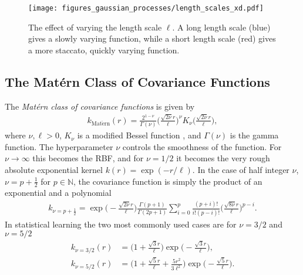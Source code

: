 \documentclass[twoside,english]{uiofysmaster}
\begin{document}
{{\begin{figure}
\centering
\texttt{[image: figures\_gaussian\_processes/length\_scales\_xd.pdf]}
\caption[An illustration of length scales]{The effect of varying the length scale $\ell$. A long length scale (blue) gives a slowly varying function, while a short length scale (red) gives a more staccato, quickly varying function.}
\label{Fig:: gaussian process : ell variation example}
\end{figure}


\subsection{The Mat\'{e}rn Class of Covariance Functions}\label{Sec:: gaussian process : Matern Class of Covariance Functions}

The \textit{Mat\'{e}rn class of covariance functions} is given by
\begin{align}\label{Eq:: gaussian process : Matern class of covariance functions}
k_{\mathrm{Mat\acute{e}rn}} (r) = \frac{2^{1- \nu}}{\Gamma (\nu)} \Big( \frac{\sqrt{2 \nu} r	}{\ell} \Big)^{\nu} K_{\nu} \Big( \frac{\sqrt{2 \nu}r}{\ell} \Big),
\end{align}
where $\nu, \ell > 0$, $K_{\nu}$ is a modified Bessel function \cite{abramowitz1964handbook}, and $\Gamma(\nu)$ is the gamma function. The hyperparameter $\nu$ controls the smoothness of the function. For $\nu \rightarrow \infty$ this becomes the RBF, and for $\nu = 1/2$ it becomes the very rough absolute exponential kernel $k(r)= \exp (-r/\ell)$. In the case of half integer $\nu$, $\nu = p + \frac{1}{2}$ for $p \in \mathbb{N}$, the covariance function is simply the product of an exponential and a polynomial
\begin{align}
k_{\nu=p+\frac{1}{2}} = \exp \Big(- \frac{\sqrt{2 \nu} r	}{\ell} \Big) \frac{\Gamma(p+1)}{\Gamma(2p + 1)} \sum^p_{i=0} \frac{(p+i)!}{i!(p-i)!} \Big( \frac{\sqrt{8 \nu} r	}{\ell} \Big)^{p-i}.
\end{align}
In statistical learning the two most commonly used cases are for $\nu = 3/2$ and $\nu = 5/2$
\begin{align}
k_{\nu = 3/2}(r) &=  \Big(1 + \frac{\sqrt{3}r}{\ell} \Big) \exp \Big( -\frac{\sqrt{3}r}{\ell} \Big),\\
k_{\nu = 5/2}(r) &=  \Big(1 + \frac{\sqrt{5}r}{\ell}  + \frac{5r^2}{3 \ell^2}\Big) \exp \Big( -\frac{\sqrt{5}r}{\ell} \Big).
\end{align}

}}
\end{document}

